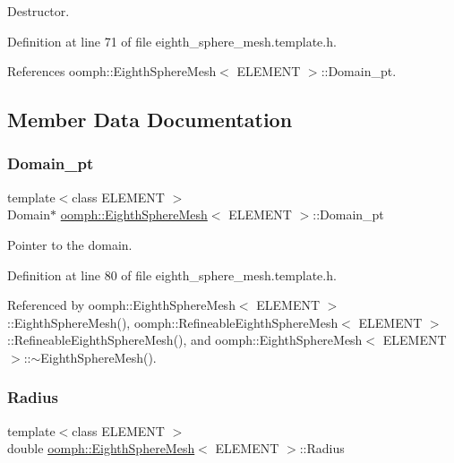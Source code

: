 Destructor. 



Definition at line 71 of file eighth\+\_\+sphere\+\_\+mesh.\+template.\+h.



References oomph\+::\+Eighth\+Sphere\+Mesh$<$ E\+L\+E\+M\+E\+N\+T $>$\+::\+Domain\+\_\+pt.



\subsection{Member Data Documentation}
\mbox{\label{classoomph_1_1EighthSphereMesh_a4b08d71a9da8cbd278cc51919cbb1a17}} 
\subsubsection{\texorpdfstring{Domain\+\_\+pt}{Domain\_pt}}
{\footnotesize\ttfamily template$<$class E\+L\+E\+M\+E\+NT $>$ \\
Domain$\ast$ \hyperlink{classoomph_1_1EighthSphereMesh}{oomph\+::\+Eighth\+Sphere\+Mesh}$<$ E\+L\+E\+M\+E\+NT $>$\+::Domain\+\_\+pt\hspace{0.3cm}{\ttfamily [protected]}}



Pointer to the domain. 



Definition at line 80 of file eighth\+\_\+sphere\+\_\+mesh.\+template.\+h.



Referenced by oomph\+::\+Eighth\+Sphere\+Mesh$<$ E\+L\+E\+M\+E\+N\+T $>$\+::\+Eighth\+Sphere\+Mesh(), oomph\+::\+Refineable\+Eighth\+Sphere\+Mesh$<$ E\+L\+E\+M\+E\+N\+T $>$\+::\+Refineable\+Eighth\+Sphere\+Mesh(), and oomph\+::\+Eighth\+Sphere\+Mesh$<$ E\+L\+E\+M\+E\+N\+T $>$\+::$\sim$\+Eighth\+Sphere\+Mesh().

\mbox{\label{classoomph_1_1EighthSphereMesh_a6dbcd3a6d27416a0d9ef25cc631f6043}} 
\subsubsection{\texorpdfstring{Radius}{Radius}}
{\footnotesize\ttfamily template$<$class E\+L\+E\+M\+E\+NT $>$ \\
double \hyperlink{classoomph_1_1EighthSphereMesh}{oomph\+::\+Eighth\+Sphere\+Mesh}$<$ E\+L\+E\+M\+E\+NT $>$\+::Radius\hspace{0.3cm}{\ttfamily [protected]}}



